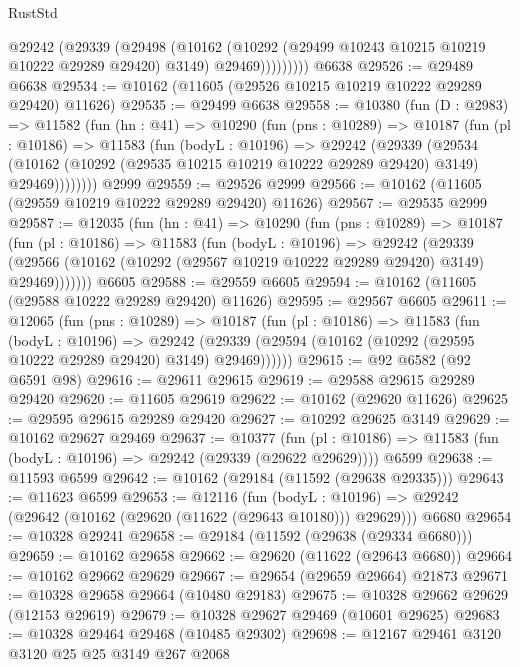 \begin{lexlean}{RustStd}
\begin{coremodule}
              @29242
                (@29339
                  (@29498
                    (@10162
                      (@10292 (@29499 @10243 @10215 @10219 @10222 @29289 @29420) @3149)
                      @29469)))))))))
    @6638
@29526 := @29489 @6638
@29534 := @10162 (@11605 (@29526 @10215 @10219 @10222 @29289 @29420) @11626)
@29535 := @29499 @6638
@29558 := @10380
    (fun (D : @2983) =>
    @11582
      (fun (hn : @41) =>
      @10290
        (fun (pns : @10289) =>
        @10187
          (fun (pl : @10186) =>
          @11583
            (fun (bodyL : @10196) =>
            @29242
              (@29339
                (@29534
                  (@10162 (@10292 (@29535 @10215 @10219 @10222 @29289 @29420) @3149) @29469))))))))
    @2999
@29559 := @29526 @2999
@29566 := @10162 (@11605 (@29559 @10219 @10222 @29289 @29420) @11626)
@29567 := @29535 @2999
@29587 := @12035
    (fun (hn : @41) =>
    @10290
      (fun (pns : @10289) =>
      @10187
        (fun (pl : @10186) =>
        @11583
          (fun (bodyL : @10196) =>
          @29242
            (@29339
              (@29566 (@10162 (@10292 (@29567 @10219 @10222 @29289 @29420) @3149) @29469)))))))
    @6605
@29588 := @29559 @6605
@29594 := @10162 (@11605 (@29588 @10222 @29289 @29420) @11626)
@29595 := @29567 @6605
@29611 := @12065
    (fun (pns : @10289) =>
    @10187
      (fun (pl : @10186) =>
      @11583
        (fun (bodyL : @10196) =>
        @29242 (@29339 (@29594 (@10162 (@10292 (@29595 @10222 @29289 @29420) @3149) @29469))))))
@29615 := @92 @6582 (@92 @6591 @98)
@29616 := @29611 @29615
@29619 := @29588 @29615 @29289 @29420
@29620 := @11605 @29619
@29622 := @10162 (@29620 @11626)
@29625 := @29595 @29615 @29289 @29420
@29627 := @10292 @29625 @3149
@29629 := @10162 @29627 @29469
@29637 := @10377
    (fun (pl : @10186) => @11583 (fun (bodyL : @10196) => @29242 (@29339 (@29622 @29629))))
    @6599
@29638 := @11593 @6599
@29642 := @10162 (@29184 (@11592 (@29638 @29335)))
@29643 := @11623 @6599
@29653 := @12116
    (fun (bodyL : @10196) => @29242 (@29642 (@10162 (@29620 (@11622 (@29643 @10180))) @29629)))
    @6680
@29654 := @10328 @29241
@29658 := @29184 (@11592 (@29638 (@29334 @6680)))
@29659 := @10162 @29658
@29662 := @29620 (@11622 (@29643 @6680))
@29664 := @10162 @29662 @29629
@29667 := @29654 (@29659 @29664) @21873
@29671 := @10328 @29658 @29664 (@10480 @29183)
@29675 := @10328 @29662 @29629 (@12153 @29619)
@29679 := @10328 @29627 @29469 (@10601 @29625)
@29683 := @10328 @29464 @29468 (@10485 @29302)
@29698 := @12167
    @29461
    @3120
    @3120
    @25
    @25
    @3149
    @267
    @2068

\end{coremodule}
\end{lexlean}

